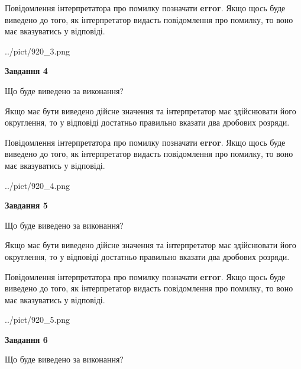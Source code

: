 \documentclass[12pt, ukrainian]{article}
\begin{document}
{\begin {Large}
Повідомлення інтерпретатора про помилку позначати \textbf{error}.
Якщо щось буде виведено до того, як інтерпретатор видасть повідомлення про помилку, 
то воно має вказуватись у відповіді. \par

\begin{center}
	{../pict/920_3.png}
\end{center}
\newpage

{\begin {center}\textbf{Завдання 4}\end {center}}\par
Що буде виведено за виконання? \par

Якщо має бути виведено дійсне значення та інтерпретатор має здійснювати його округлення, 
то у відповіді достатньо правильно вказати два дробових розряди.

Повідомлення інтерпретатора про помилку позначати \textbf{error}.
Якщо щось буде виведено до того, як інтерпретатор видасть повідомлення про помилку, 
то воно має вказуватись у відповіді. \par

\begin{center}
	{../pict/920_4.png}
\end{center}
\newpage

{\begin {center}\textbf{Завдання 5}\end {center}}\par
Що буде виведено за виконання? \par

Якщо має бути виведено дійсне значення та інтерпретатор має здійснювати його округлення, 
то у відповіді достатньо правильно вказати два дробових розряди.

Повідомлення інтерпретатора про помилку позначати \textbf{error}.
Якщо щось буде виведено до того, як інтерпретатор видасть повідомлення про помилку, 
то воно має вказуватись у відповіді. \par

\begin{center}
	{../pict/920_5.png}
\end{center}
\newpage

{\begin {center}\textbf{Завдання 6}\end {center}}\par
Що буде виведено за виконання? \par


\end{Large}}
\end{document}
